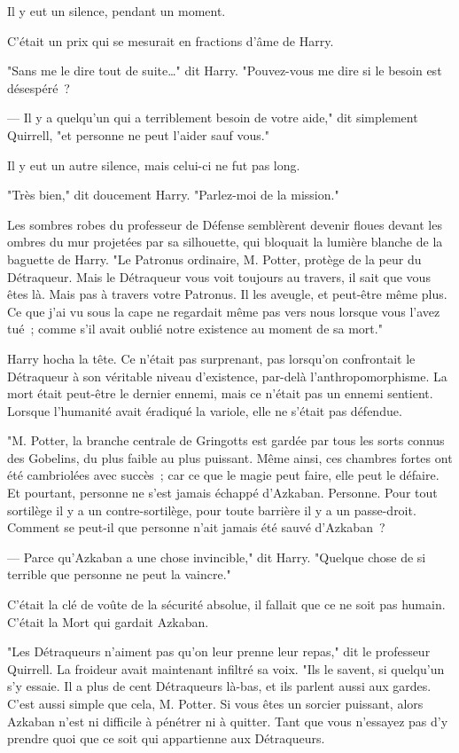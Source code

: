Il y eut un silence, pendant un moment.

C'était un prix qui se mesurait en fractions d'âme de Harry.

"Sans me le dire tout de suite…" dit Harry. "Pouvez-vous me dire si le besoin est désespéré~?

--- Il y a quelqu'un qui a terriblement besoin de votre aide," dit simplement Quirrell, "et personne ne peut l'aider sauf vous."

Il y eut un autre silence, mais celui-ci ne fut pas long.

"Très bien," dit doucement Harry. "Parlez-moi de la mission."

Les sombres robes du professeur de Défense semblèrent devenir floues devant les ombres du mur projetées par sa silhouette, qui bloquait la lumière blanche de la baguette de Harry. "Le Patronus ordinaire, M. Potter, protège de la peur du Détraqueur. Mais le Détraqueur vous voit toujours au travers, il sait que vous êtes là. Mais pas à travers votre Patronus. Il les aveugle, et peut-être même plus. Ce que j'ai vu sous la cape ne regardait même pas vers nous lorsque vous l'avez tué~; comme s'il avait oublié notre existence au moment de sa mort."

Harry hocha la tête. Ce n'était pas surprenant, pas lorsqu'on confrontait le Détraqueur à son véritable niveau d'existence, par-delà l'anthropomorphisme. La mort était peut-être le dernier ennemi, mais ce n'était pas un ennemi sentient. Lorsque l'humanité avait éradiqué la variole, elle ne s'était pas défendue.

"M. Potter, la branche centrale de Gringotts est gardée par tous les sorts connus des Gobelins, du plus faible au plus puissant. Même ainsi, ces chambres fortes ont été cambriolées avec succès~; car ce que le magie peut faire, elle peut le défaire. Et pourtant, personne ne s'est jamais échappé d'Azkaban. Personne. Pour tout sortilège il y a un contre-sortilège, pour toute barrière il y a un passe-droit. Comment se peut-il que personne n'ait jamais été sauvé d'Azkaban~?

--- Parce qu'Azkaban a une chose invincible," dit Harry. "Quelque chose de si terrible que personne ne peut la vaincre."

C'était la clé de voûte de la sécurité absolue, il fallait que ce ne soit pas humain. C'était la Mort qui gardait Azkaban.

"Les Détraqueurs n'aiment pas qu'on leur prenne leur repas," dit le professeur Quirrell. La froideur avait maintenant infiltré sa voix. "Ils le savent, si quelqu'un s'y essaie. Il a plus de cent Détraqueurs là-bas, et ils parlent aussi aux gardes. C'est aussi simple que cela, M. Potter. Si vous êtes un sorcier puissant, alors Azkaban n'est ni difficile à pénétrer ni à quitter. Tant que vous n'essayez pas d'y prendre quoi que ce soit qui appartienne aux Détraqueurs.

